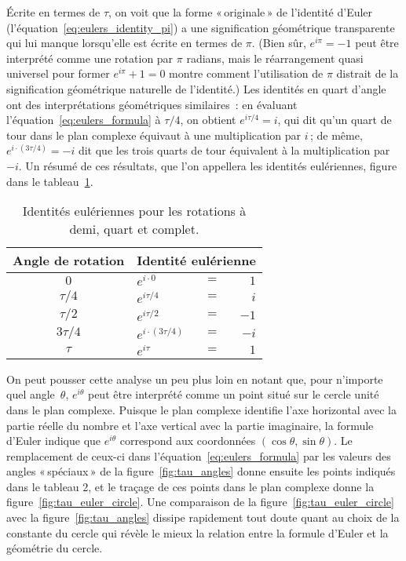 Écrite en termes de $\tau$, on voit que la forme «\,originale\,» de l'identité d'Euler (l'équation~\eqref{eq:eulers_identity_pi}) a une signification géométrique transparente qui lui manque lorsqu'elle est écrite en termes de $\pi$. (Bien sûr, $e^{i\pi} = -1$ peut être interprété comme une rotation par $\pi$ radians, mais le réarrangement quasi universel pour former $e^{i\pi} + 1 = 0$ montre comment l'utilisation de $\pi$ distrait de la signification géométrique naturelle de l'identité.) Les identités en quart d'angle ont des interprétations géométriques similaires~: en évaluant l'équation~\eqref{eq:eulers_formula} à $\tau/4$, on obtient $e^{i\tau/4} = i$, qui dit qu'un quart de tour dans le plan complexe équivaut à une multiplication par $i$\,; de même, $e^{i\cdot(3\tau/4)} = -i$ dit que les trois quarts de tour équivalent à la multiplication par $-i$. Un résumé de ces résultats, que l'on appellera les identités eulériennes, figure dans le tableau~\ref{table:eulerian_identities}.

\begin{table}
\begin{center}
\begin{tabular}{cllr}
Angle de rotation & \multicolumn{3}{c}{Identité eulérienne} \\ \hline
$0$ & $e^{i\cdot0}$ & $ = $ & $1$ \smallskip \\
$\tau/4$ & $e^{i\tau/4}$ & $ = $ & $i$ \smallskip \\
$\tau/2$ & $e^{i\tau/2}$ & $ = $ & $-1$ \smallskip \\
$3\tau/4$ & $e^{i\cdot(3\tau/4)}$ & $ = $ & $-i$ \smallskip \\
$\tau$ & $e^{i\tau}$ & $ = $ & $1$
\end{tabular}
\end{center}
\caption{Identités eulériennes pour les rotations à demi, quart et complet.\label{table:eulerian_identities}}
\end{table}

On peut pousser cette analyse un peu plus loin en notant que, pour n'importe quel angle~$\theta$, $e^{i\theta}$ peut être interprété comme un point situé sur le cercle unité dans le plan complexe. Puisque le plan complexe identifie l'axe horizontal avec la partie réelle du nombre et l'axe vertical avec la partie imaginaire, la formule d'Euler indique que $e^{i\theta}$ correspond aux coordonnées $(\cos\theta,\sin\theta)$. Le remplacement de ceux-ci dans l'équation~\eqref{eq:eulers_formula} par les valeurs des angles «\,spéciaux\,» de la figure~\ref{fig:tau_angles} donne ensuite les points indiqués dans le tableau 2, et le traçage de ces points dans le plan complexe donne la figure~\ref{fig:tau_euler_circle}. Une comparaison de la figure~\ref{fig:tau_euler_circle} avec la figure~\ref{fig:tau_angles} dissipe rapidement tout doute quant au choix de la constante du cercle qui révèle le mieux la relation entre la formule d'Euler et la géométrie du cercle.

